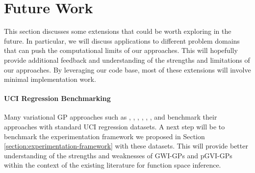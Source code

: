 \documentclass{article}
\def\code#1{\texttt{#1}}
\numberwithin{equation}{section}
\begin{document}
\newpage
\section{Future Work}\label{section:future-work}
This section discusses some extensions that could be worth exploring in the future. 
In particular, we will discuss applications to different problem domains that can push the computational limits of our approaches. 
This will hopefully provide additional feedback and understanding of the strengths and limitations of our approaches.
By leveraging our code base, most of these extensions will involve minimal implementation work.


\paragraph{UCI Regression Benchmarking} 
Many variational GP approaches such as \cite{wild2022generalized}, \cite{blundell2015weight}, \cite{gal2015dropout}, \cite{li2017dropout}, \cite{ma2021functional}, \cite{ma2019variational}, and \cite{sun2019functional} benchmark their approaches with standard UCI regression datasets. 
A next step will be to benchmark the experimentation framework we proposed in Section \ref{section:experimentation-framework} with these datasets.
This will provide better understanding of the strengths and weaknesses of GWI-GPs and pGVI-GPs within the context of the existing literature for function space inference.
\end{document}
